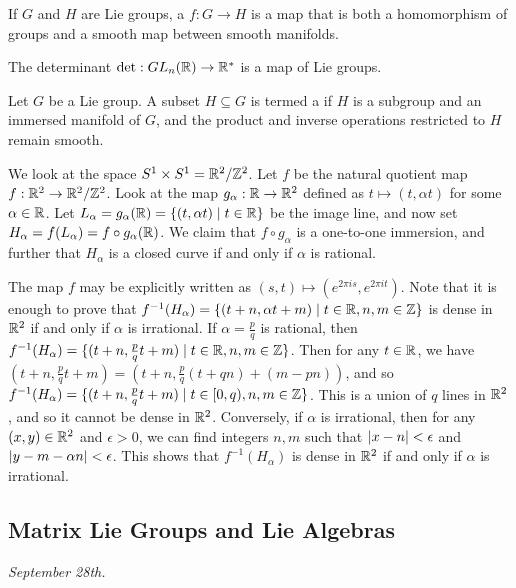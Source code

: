 \begin{definition}
    If $G$ and $H$ are Lie groups, a  $f:G \to H$ is a map that is both a homomorphism of groups and a smooth map between smooth manifolds.
\end{definition}
The determinant $\det:GL_{n}(\mathbb{R}) \to \mathbb{R}^{\ast}$ is a map of Lie groups.
\begin{definition}
    Let $G$ be a Lie group. A subset $H \subseteq G$ is termed a  if $H$ is a subgroup and an immersed manifold of $G$, and the product and inverse operations restricted to $H$ remain smooth.
\end{definition}
\begin{example}
    We look at the space $S^{1} \times S^{1} = \mathbb{R}^{2}/\mathbb{Z}^{2}$. Let $f$ be the natural quotient map $f:\mathbb{R}^{2} \to \mathbb{R}^{2}/\mathbb{Z}^{2}$. Look at the map $g_{\alpha}:\mathbb{R}\to\mathbb{R}^{2}$ defined as $t \mapsto (t,\alpha t)$ for some $\alpha \in \mathbb{R}$. Let $L_{\alpha} = g_{\alpha}(\mathbb{R}) = \{(t,\alpha t) \mid t \in \mathbb{R}\}$ be the image line, and now set $H_{\alpha} = f(L_{\alpha}) = f \circ g_{\alpha}(\mathbb{R})$. We claim that $f \circ g_{\alpha}$ is a one-to-one immersion, and further that $H_{\alpha}$ is a closed curve if and only if $\alpha$ is rational.

    The map $f$ may be explicitly written as $(s,t) \mapsto (e^{2\pi i s}, e^{2\pi i t})$. Note that it is enough to prove that $f^{-1}(H_{\alpha}) = \{(t+n,\alpha t + m) \mid t \in \mathbb{R}, n,m \in \mathbb{Z}\}$ is dense in $\mathbb{R}^{2}$ if and only if $\alpha$ is irrational. If $\alpha = \frac{p}{q}$ is rational, then $f^{-1}(H_{\alpha}) = \{(t+n,\frac{p}{q}t + m) \mid t \in \mathbb{R}, n,m \in \mathbb{Z}\}$. Then for any $t \in \mathbb{R}$, we have $(t+n,\frac{p}{q}t + m) = (t+n,\frac{p}{q}(t+qn) + (m-pn))$, and so $f^{-1}(H_{\alpha}) = \{(t+n,\frac{p}{q}t + m) \mid t \in [0,q), n,m \in \mathbb{Z}\}$. This is a union of $q$ lines in $\mathbb{R}^{2}$, and so it cannot be dense in $\mathbb{R}^{2}$. Conversely, if $\alpha$ is irrational, then for any $(x,y) \in \mathbb{R}^{2}$ and $\epsilon > 0$, we can find integers $n,m$ such that $\left| x - n \right| < \epsilon$ and $\left| y - m - \alpha n \right| < \epsilon$. This shows that $f^{-1}(H_{\alpha})$ is dense in $\mathbb{R}^{2}$ if and only if $\alpha$ is irrational.
\end{example}

\subsection{Matrix Lie Groups and Lie Algebras}
\textit{September 28th.}


